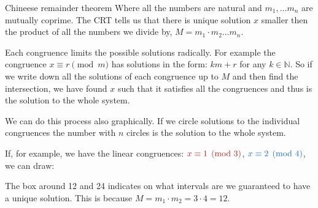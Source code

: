 \documentclass[final]{beamer}
\newlength{\colwidth}
\newcommand{\clr}{\textcolor{BrickRed}}
\newcommand{\clb}{\textcolor{RoyalBlue}}
\newcommand{\N}{\mathbb{N}}
\begin{document}
\begin{frame}[t]
\begin{columns}[t]
\begin{column}{\colwidth}
\begin{alertblock}{Chineese remainder theorem}
 Where all the numbers are natural and $m_1,\ldots m_n$ are mutually coprime.
 The CRT tells us that there is unique solution $x$ smaller then the product of
 all the numbers we divide by, $M = m_1 \cdot m_2
 \ldots m_n$.

Each congruence limits the possible solutions radically. For example the
congruence $x \equiv r \pmod{m}$ has solutions in the form: $km + r$ for any $k
\in \N$. So if we write down all the solutions of each congruence up to $M$ and
then find the intersection, we have found $x$ such that it satisfies all the
congruences and thus is the solution to the whole system.

We can do this process also graphically. If we circle solutions to the
individual congruences the number with $n$ circles is the solution to the whole
system.

 If, for example, we have the linear congruences: $\clr{x \equiv 1 \pmod{3}}$,
 $\clb{x \equiv 2 \pmod{4}}$, we can draw:

\begin{center}
\end{center}
The box around 12 and 24 indicates on what intervals are we guaranteed to have a
unique solution. This is because $M=m_1 \cdot m_2 = 3 \cdot 4 = 12$.


\end{alertblock}
\end{column}
\end{columns}
\end{frame}
\end{document}
